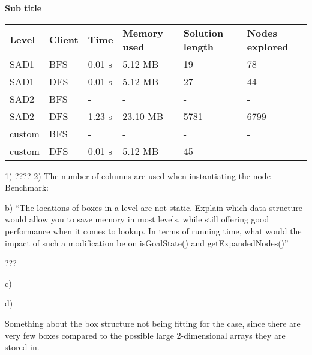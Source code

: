 \documentclass[Main]{subfiles}
\begin{document}
\textbf{Sub title}



\begin{table}[h]
\begin{tabular}{llllll}
\rowcolor[HTML]{EFEFEF} 
\textbf{Level} & \textbf{Client} & \textbf{Time} & \textbf{Memory used} & \textbf{Solution length} & \textbf{Nodes explored} \\
SAD1           & BFS             & 0.01 s        & 5.12 MB              & 19                       & 78                      \\
SAD1           & DFS             & 0.01 s        & 5.12 MB              & 27                       & 44                      \\
SAD2           & BFS             & -           & -                  & -                      & -                     \\
SAD2           & DFS             & 1.23 s        & 23.10 MB             & 5781                     & 6799                    \\
custom         & BFS             & -           & -                  & -                      & -                     \\
custom         & DFS             & 0.01 s        & 5.12 MB              & 45                       &                        
\end{tabular}
\end{table}



1) ????
2) The number of columns are used when instantiating the node
Benchmark:


b) ``The locations of boxes in a level are not static. Explain which data structure would allow you to save memory in most levels, while still offering good performance when it comes to lookup. In terms of running time, what would the impact of such a modification be on isGoalState() and getExpandedNodes()''

???

c)

d) 

Something about the box structure not being fitting for the case, since there are very few boxes compared to the possible large 2-dimensional arrays they are stored in. 
\end{document}
